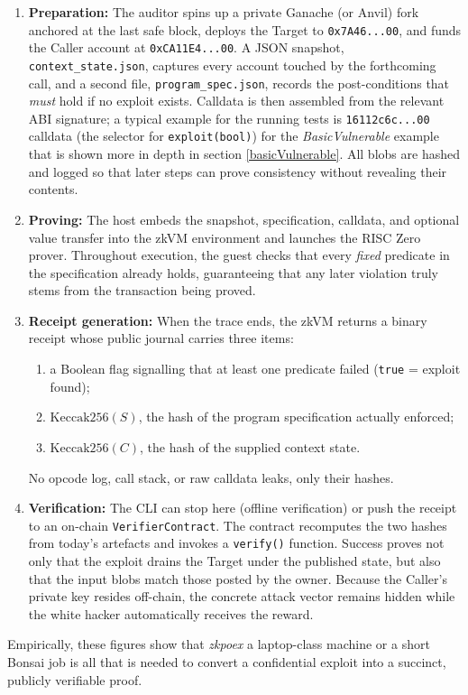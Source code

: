 \begin{enumerate}
  \item \textbf{Preparation:}  
        The auditor spins up a private Ganache (or Anvil) fork anchored at the
        last safe block, deploys the Target to \texttt{0x7A46...00}, and funds the Caller account at \texttt{0xCA11E4...00}. A JSON snapshot, \texttt{context\_state.json}, captures every account touched by the forthcoming call, and a second file, \texttt{program\_spec.json}, records the post-conditions that \textit{must} hold if no exploit exists. Calldata is then assembled from the relevant ABI signature; a typical example for the running tests is \texttt{16112c6c...00} calldata (the selector for \texttt{exploit(bool)}) for the \textit{BasicVulnerable} example that is shown more in depth in section \ref{basicVulnerable}. All blobs are hashed and logged so that later steps can prove consistency without revealing their contents.
  \item \textbf{Proving:}
        The host embeds the snapshot, specification, calldata, and optional value transfer into the zkVM environment and launches the RISC Zero prover.
        Throughout execution, the guest checks that every \textit{fixed} predicate in the specification already holds, guaranteeing that any later violation truly stems from the transaction being proved.
  \item \textbf{Receipt generation:}  
        When the trace ends, the zkVM returns a binary receipt whose public journal carries three items:
        \begin{enumerate}
          \item a Boolean flag signalling that at least one predicate failed
                (\texttt{true} = exploit found);
          \item \(\mathrm{Keccak256}(S)\), the hash of the program
                specification actually enforced;
          \item \(\mathrm{Keccak256}(C)\), the hash of the supplied context
                state.
        \end{enumerate}
        No opcode log, call stack, or raw calldata leaks, only their hashes.
  \item \textbf{Verification:}  
        The CLI can stop here (offline verification) or push the receipt to an on-chain \texttt{VerifierContract}. The contract recomputes the two hashes from today’s artefacts and invokes a \texttt{verify()} function. Success proves not only that the exploit drains the Target under the published state, but also that the input blobs match those posted by the owner. Because the Caller’s private key resides off-chain, the concrete attack vector remains hidden while the white hacker automatically receives the reward.
\end{enumerate}

Empirically, these figures show that \emph{zkpoex} a laptop-class machine or a short Bonsai job is all that is needed to convert a confidential exploit into a succinct, publicly verifiable proof.




